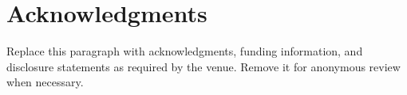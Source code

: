 \documentclass[10pt,twocolumn]{article}
\begin{document}
\maketitle









\section*{Acknowledgments}
Replace this paragraph with acknowledgments, funding information, and disclosure statements as required by the venue. Remove it for anonymous review when necessary.




\clearpage
\appendix

\end{document}

